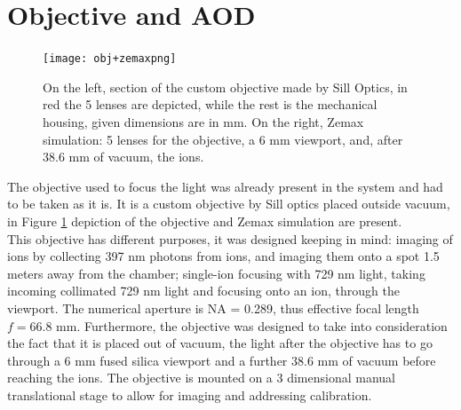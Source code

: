 \section{Objective and AOD}
\label{sec:obj}
%
\begin{figure}[H]
      \centering
          \centering
          \texttt{[image: obj+zemaxpng]}
           \caption{On the left, section of the custom objective made by Sill Optics, in red the 5 lenses are depicted, while the rest is the mechanical housing, given dimensions are in mm. On the right, Zemax simulation: 5 lenses for the objective, a 6 mm viewport, and, after 38.6 mm of vacuum, the ions.}
          \label{objsection}
\end{figure}
The objective used to focus the light was already present in the system and had to be taken as it is. It is a custom objective by Sill optics placed outside vacuum, in Figure \ref{objsection} depiction of the objective and Zemax simulation are present.\\
This objective has different purposes, it was designed keeping in mind: imaging of ions by collecting 397 nm photons from ions, and imaging them onto a spot 1.5 meters away from the chamber; single-ion focusing with 729 nm light, taking incoming collimated 729 nm light and focusing onto an ion, through the viewport. The numerical aperture is NA = 0.289, thus effective focal length $f = 66.8$ mm. Furthermore, the objective was designed to take into consideration the fact that it is placed out of vacuum, the light after the objective has to go through a 6 mm fused silica viewport and a further 38.6 mm of vacuum before reaching the ions. The objective is mounted on a 3 dimensional manual translational stage to allow for imaging and addressing calibration.\\
